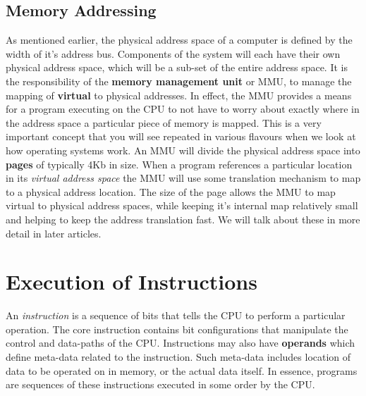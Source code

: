 \documentclass[10pt,a4paper]{article}
\begin{document}
\subsection{Memory Addressing}
As mentioned earlier, the physical address space of a computer is defined by the width of it's address bus. Components of the system will each have their own physical address space, which will be a sub-set of the entire address space. It is the responsibility of the \textbf{memory management unit} or MMU, to manage the mapping of \textbf{virtual} to physical addresses. In effect, the MMU provides a means for a program executing on the CPU to not have to worry about exactly where in the address space a particular piece of memory is mapped. This is a very important concept that you will see repeated in various flavours when we look at how operating systems work. 
\newline\newline
An MMU will divide the physical address space into \textbf{pages} of typically 4Kb in size. When a program references a particular location in its \textit{virtual address space} the MMU will use some translation mechanism to map to a physical address location. The size of the page allows the MMU to map virtual to physical address spaces, while keeping it's internal map relatively small and helping to keep the address translation fast. We will talk about these in more detail in later articles. 
\section{Execution of Instructions}
An \textit{instruction} is a sequence of bits that tells the CPU to perform a particular operation. The core instruction contains bit configurations that manipulate the control and data-paths of the CPU. Instructions may also have \textbf{operands} which define meta-data related to the instruction. Such meta-data includes location of data to be operated on in memory, or the actual data itself. In essence, programs are sequences of these instructions executed in some order by the CPU.
\end{document}
